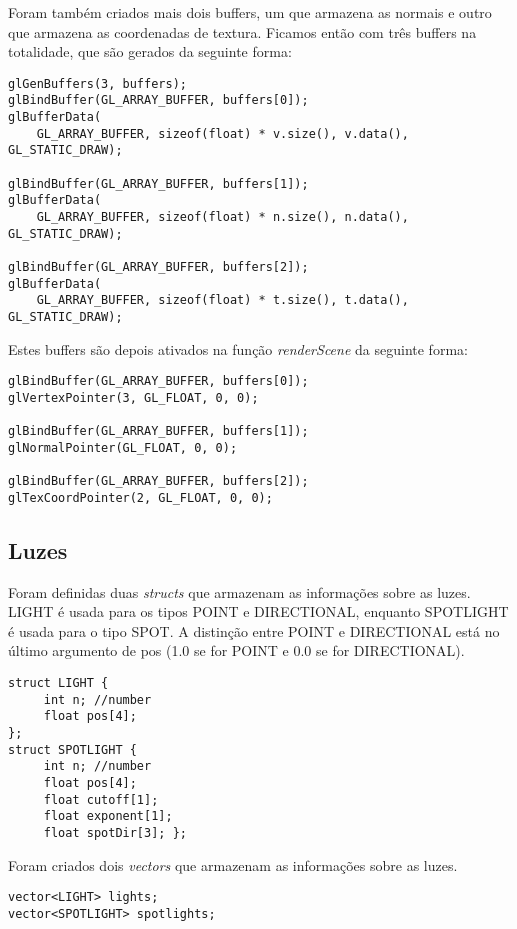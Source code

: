 \documentclass[11pt,a4paper]{report}
\begin{document}
Foram também criados mais dois buffers, um que armazena as normais e outro que armazena as coordenadas de textura.
\newpage
Ficamos então com três buffers na totalidade, que são gerados da seguinte forma:
\begin{lstlisting}[style = code]
glGenBuffers(3, buffers);
glBindBuffer(GL_ARRAY_BUFFER, buffers[0]);
glBufferData(
	GL_ARRAY_BUFFER, sizeof(float) * v.size(), v.data(), GL_STATIC_DRAW);

glBindBuffer(GL_ARRAY_BUFFER, buffers[1]);
glBufferData(
	GL_ARRAY_BUFFER, sizeof(float) * n.size(), n.data(), GL_STATIC_DRAW);

glBindBuffer(GL_ARRAY_BUFFER, buffers[2]);
glBufferData(
	GL_ARRAY_BUFFER, sizeof(float) * t.size(), t.data(), GL_STATIC_DRAW);
\end{lstlisting}

Estes buffers são depois ativados na função \emph{renderScene} da seguinte forma:
\begin{lstlisting}[style = code]
glBindBuffer(GL_ARRAY_BUFFER, buffers[0]);
glVertexPointer(3, GL_FLOAT, 0, 0);

glBindBuffer(GL_ARRAY_BUFFER, buffers[1]);
glNormalPointer(GL_FLOAT, 0, 0);

glBindBuffer(GL_ARRAY_BUFFER, buffers[2]);
glTexCoordPointer(2, GL_FLOAT, 0, 0);
\end{lstlisting}

\subsection{Luzes}
Foram definidas duas \emph{structs} que armazenam as informações sobre as luzes. LIGHT é usada para os tipos POINT e DIRECTIONAL, enquanto SPOTLIGHT é usada para o tipo SPOT. A distinção entre POINT e DIRECTIONAL está no último argumento de pos (1.0 se for POINT e 0.0 se for DIRECTIONAL).

\begin{lstlisting}[style = code]
struct LIGHT {
	 int n; //number
	 float pos[4];
};
struct SPOTLIGHT {
	 int n; //number
	 float pos[4];
	 float cutoff[1];
	 float exponent[1];
	 float spotDir[3]; };
\end{lstlisting}

Foram criados dois \emph{vectors} que armazenam as informações sobre as luzes.

\begin{lstlisting}[style = code]
vector<LIGHT> lights;
vector<SPOTLIGHT> spotlights;
\end{lstlisting}
\end{document}
